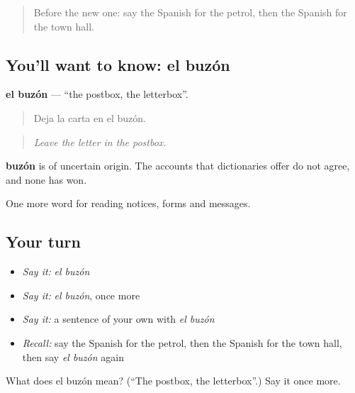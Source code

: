 \label{lesson:ES-C489-buzon}



\begin{quote}
Before the new one: say the Spanish for the petrol, then the Spanish for the town hall.
\end{quote}

\subsection*{You'll want to know: el buzón}
\textbf{el buzón} — \textquotedblleft{}the postbox, the letterbox\textquotedblright{}.

\begin{quote}
Deja la carta en el buzón.
\end{quote}

\begin{quote}
\emph{Leave the letter in the postbox.}
\end{quote}

\begin{cousinweb}
\textbf{buzón} is of uncertain origin. The accounts that dictionaries offer do not agree, and none has won.
\end{cousinweb}

\begin{grammarlens}[title={What you've built}]
One more word for reading notices, forms and messages.
\end{grammarlens}

\subsection*{Your turn}
\begin{itemize}
\raggedright
  \item \emph{Say it:} \emph{el buzón}
  \item \emph{Say it:} \emph{el buzón}, once more
  \item \emph{Say it:} a sentence of your own with \emph{el buzón}
  \item \emph{Recall:} say the Spanish for the petrol, then the Spanish for the town hall, then say \emph{el buzón} again
\end{itemize}

\begin{tcolorbox}[breakable,colback=teal!4,colframe=teal!35!black,title={Before you move on}]
What does el buzón mean? (\textquotedblleft{}The postbox, the letterbox\textquotedblright{}.) Say it once more.
\end{tcolorbox}
